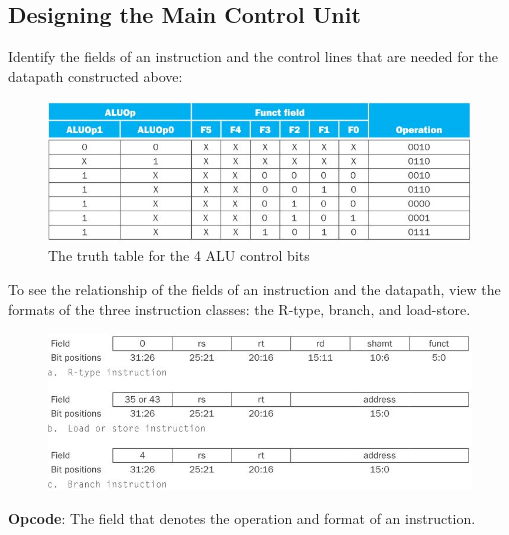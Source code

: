 \documentclass[10pt,a4paper]{article}
\begin{document}
\pagebreak
\subsection{Designing the Main Control Unit}

Identify the fields of an instruction and the control lines that are needed for the datapath
constructed above: 
\begin{figure} [h!]
    \centering
    \includegraphics[scale=0.7]{ALU simplified.JPG}
    \caption{ The truth table for the 4 ALU control bits}
\end{figure} 

To see the relationship of the fields of an instruction and the datapath, view the formats of the
three instruction classes: the R-type, branch, and load-store.
\begin{figure} [h!]
    \centering
    \includegraphics[scale=0.75]{Three types.JPG}
\end{figure} 

\begin{tcolorbox}[breakable,colback=white]
\textbf{Opcode}: The field that denotes the operation and format of an instruction.
\end{tcolorbox}
\end{document}
